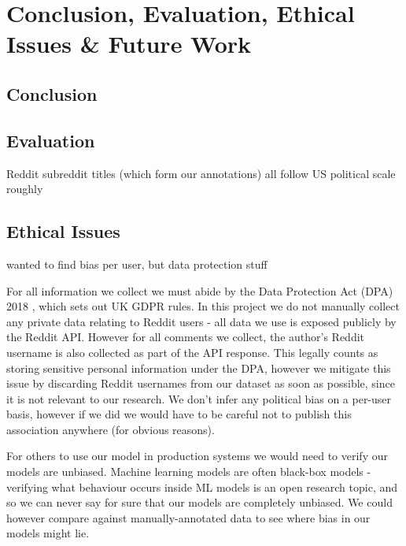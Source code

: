 \chapter{Conclusion, Evaluation, Ethical Issues \& Future Work}

\section{Conclusion}



\section{Evaluation}

Reddit subreddit titles (which form our annotations) all follow US political scale roughly

\section{Ethical Issues}



wanted to find bias per user, but data protection stuff



For all information we collect we must abide by the Data Protection Act (DPA) 2018 \cite{dpa}, which sets out UK GDPR rules. In this project we do not manually collect any private data relating to Reddit users - all data we use is exposed publicly by the Reddit API. However for all comments we collect, the author's Reddit username is also collected as part of the API response. This legally counts as storing sensitive personal information under the DPA, however we mitigate this issue by discarding Reddit usernames from our dataset as soon as possible, since it is not relevant to our research. We don't infer any political bias on a per-user basis, however if we did we would have to be careful not to publish this association anywhere (for obvious reasons).

For others to use our model in production systems we would need to verify our models are unbiased. Machine learning models are often black-box models - verifying what behaviour occurs inside ML models is an open research topic, and so we can never say for sure that our models are completely unbiased. We could however compare against manually-annotated data to see where bias in our models might lie.


